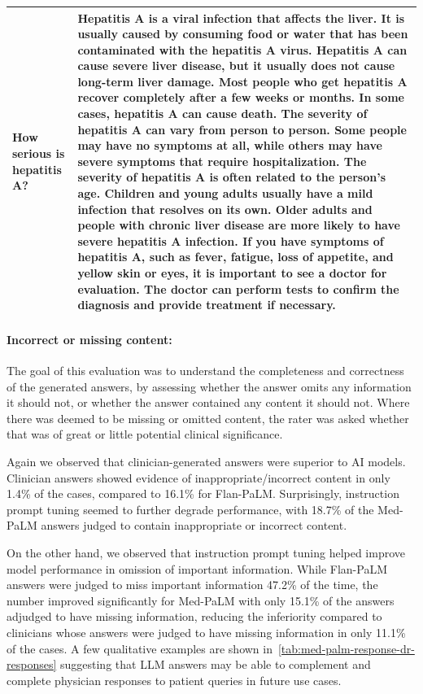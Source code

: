 \documentclass[10pt, letter, onecolumn]{arxiv}
\begin{document}
\begin{refsection}
\begin{table}[]
\begin{tabular}{p{}p{}}
How serious is hepatitis A? &
    Hepatitis A is a viral infection that affects the liver. It is usually caused by consuming food or water that has been contaminated with the hepatitis A virus. Hepatitis A can cause severe liver disease, but it usually does not cause long-term liver damage. Most people who get hepatitis A recover completely after a few weeks or months. In some cases, hepatitis A can cause death. The severity of hepatitis A can vary from person to person. Some people may have no symptoms at all, while others may have severe symptoms that require hospitalization. The severity of hepatitis A is often related to the person's age. Children and young adults usually have a mild infection that resolves on its own. Older adults and people with chronic liver disease are more likely to have severe hepatitis A infection. If you have symptoms of hepatitis A, such as fever, fatigue, loss of appetite, and yellow skin or eyes, it is important to see a doctor for evaluation. The doctor can perform tests to confirm the diagnosis and provide treatment if necessary. \\ \bottomrule       
 
  
\end{tabular}
\end{table}

\paragraph{Incorrect or missing content:}

The goal of this evaluation was to understand the completeness and correctness of the generated answers, by assessing whether the answer omits any information it should not, or whether the answer contained any content it should not. Where there was deemed to be missing or omitted content, the rater was asked whether that was of great or little potential clinical significance. 

Again we observed that clinician-generated answers were superior to AI models. Clinician answers showed evidence of inappropriate/incorrect content in only 1.4\% of the cases, compared to 16.1\% for Flan-PaLM. Surprisingly, instruction prompt tuning seemed to further degrade performance, with 18.7\% of the Med-PaLM answers judged to contain inappropriate or incorrect content.

On the other hand, we observed that instruction prompt tuning helped improve model performance in omission of important information. While Flan-PaLM answers were judged to miss important information 47.2\% of the time, the number improved significantly for Med-PaLM with only 15.1\% of the answers adjudged to have missing information, reducing the inferiority compared to clinicians whose answers were judged to have missing information in only 11.1\% of the cases. A few qualitative examples are shown in~\cref{tab:med-palm-response-dr-responses} suggesting that LLM answers may be able to complement and complete physician responses to patient queries in future use cases. 


\end{refsection}
\end{document}
